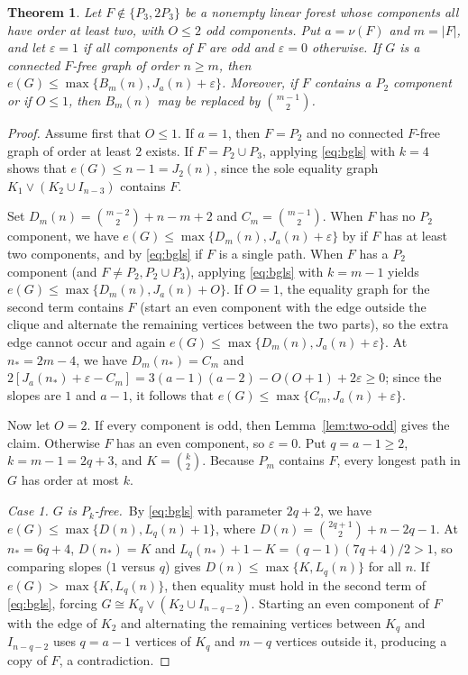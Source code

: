 \documentclass[10pt]{article}
\theoremstyle{compactplain}
\newtheorem{theorem}{Theorem}[section]
\theoremstyle{remark}\newtheorem{remark}[theorem]{Remark}
\begin{document}
\begin{theorem}\label{thm:at-most-two-odd}
Let $F\notin\{P_3,2P_3\}$ be a nonempty linear forest whose components
all have order at least two, with $O\le2$ odd components. Put
$a=\nu(F)$ and $m=|F|$, and let $\varepsilon=1$ if all components of $F$
are odd and $\varepsilon=0$ otherwise. If $G$ is a connected $F$-free
graph of order $n\ge m$, then
$e(G)\le\max\{B_m(n),J_a(n)+\varepsilon\}$. Moreover, if $F$ contains a
$P_2$ component or if $O\le1$, then $B_m(n)$ may be replaced by
$\binom{m-1}{2}$.
\end{theorem}
\begin{proof}
Assume first that $O\le1$. If $a=1$, then $F=P_2$ and no connected
$F$-free graph of order at least $2$ exists. If $F=P_2\cup P_3$,
applying \eqref{eq:bgls} with $k=4$ shows that $e(G)\le n-1=J_2(n)$,
since the sole equality graph $K_1\vee(K_2\cup I_{n-3})$ contains $F$.

Set $D_m(n)=\binom{m-2}{2}+n-m+2$ and $C_m=\binom{m-1}{2}$. When $F$ has
no $P_2$ component, we have $e(G)\le\max\{D_m(n),J_a(n)+\varepsilon\}$
by \cite[Lemma~2.1]{YZ} if $F$ has at least two components, and by
\eqref{eq:bgls} if $F$ is a single path. When $F$ has a $P_2$ component
(and $F\ne P_2,P_2\cup P_3$), applying \eqref{eq:bgls} with $k=m-1$
yields $e(G)\le\max\{D_m(n),J_a(n)+O\}$. If $O=1$, the equality graph
for the second term contains $F$ (start an even component with the edge
outside the clique and alternate the remaining vertices between the two
parts), so the extra edge cannot occur and again
$e(G)\le\max\{D_m(n),J_a(n)+\varepsilon\}$. At $n_*=2m-4$, we have
$D_m(n_*)=C_m$ and
$2[J_a(n_*)+\varepsilon-C_m]=3(a-1)(a-2)-O(O+1)+2\varepsilon\ge0$; since
the slopes are $1$ and $a-1$, it follows that
$e(G)\le\max\{C_m,J_a(n)+\varepsilon\}$.

Now let $O=2$. If every component is odd, then Lemma~\ref{lem:two-odd}
gives the claim. Otherwise $F$ has an even component, so
$\varepsilon=0$. Put $q=a-1\ge2$, $k=m-1=2q+3$, and $K=\binom{k}{2}$.
Because $P_m$ contains $F$, every longest path in $G$ has order at most
$k$.

\medskip\noindent\emph{Case 1. $G$ is $P_k$-free.}\ 
By \eqref{eq:bgls} with parameter $2q+2$, we have
$e(G)\le\max\{D(n),L_q(n)+1\}$, where $D(n)=\binom{2q+1}{2}+n-2q-1$. At
$n_*=6q+4$, $D(n_*)=K$ and $L_q(n_*)+1-K=(q-1)(7q+4)/2>1$, so comparing
slopes ($1$ versus $q$) gives $D(n)\le\max\{K,L_q(n)\}$ for all $n$. If
$e(G)>\max\{K,L_q(n)\}$, then equality must hold in the second term of
\eqref{eq:bgls}, forcing $G\cong K_q\vee(K_2\cup I_{n-q-2})$. Starting
an even component of $F$ with the edge of $K_2$ and alternating the
remaining vertices between $K_q$ and $I_{n-q-2}$ uses $q=a-1$ vertices
of $K_q$ and $m-q$ vertices outside it, producing a copy of $F$, a
contradiction.


\end{proof}
\end{document}
